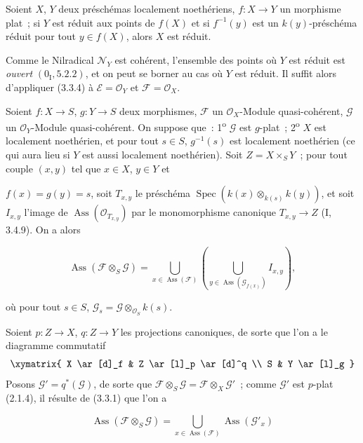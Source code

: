 \begin{corollary}[3.3.5]
\label{IV.2.3.3.5-fr}
Soient $X$, $Y$ deux préschémas localement noethériens, $f:X\to Y$ un
morphisme plat~; si $Y$ est réduit aux points de $f(X)$ et si $f^{-1}(y)$ est
un $k(y)$-préschéma réduit pour tout $y\in f(X)$, alors $X$ est réduit.
\end{corollary}

Comme le Nilradical $\mathcal N_Y$ est cohérent, l'ensemble des points où $Y$
est réduit est \emph{ouvert} $(0_{\mathrm I},5.2.2)$, et on peut se borner au
cas où $Y$ est réduit. Il suffit alors d'appliquer (3.3.4) à
$\mathcal E=\mathcal O_Y$ et $\mathcal F=\mathcal O_X$.

\begin{proposition}[3.3.6]
\label{IV.2.3.3.6-fr}
Soient $f:X\to S$, $g:Y\to S$ deux morphismes, $\mathcal F$ un
$\mathcal O_X$-Module quasi-cohérent, $\mathcal G$ un $\mathcal O_Y$-Module
quasi-cohérent. On suppose que~: 1\textsuperscript{o} $\mathcal G$ est
$g$-plat~; 2\textsuperscript{o} $X$ est localement noethérien, et pour tout
$s\in S$, $g^{-1}(s)$ est localement noethérien (ce qui aura lieu si $Y$ est
aussi localement noethérien). Soit $Z=X\times_S Y$~; pour tout couple $(x,y)$
tel que $x\in X$, $y\in Y$ et

$f(x)=g(y)=s$, soit $T_{x,y}$ le préschéma
$\operatorname{Spec}(k(x)\otimes_{k(s)}k(y))$, et soit $I_{x,y}$ l'image de
$\operatorname{Ass}(\mathcal O_{T_{x,y}})$ par le monomorphisme canonique
$T_{x,y}\to Z$ (I, 3.4.9). On a alors
\end{proposition}

\begin{env}[3.3.6.1]
\label{IV.2.3.3.6.1-fr}
\[
\operatorname{Ass}(\mathcal F\otimes_S\mathcal G)
=\bigcup_{x\in\operatorname{Ass}(\mathcal F)}
\left(\bigcup_{y\in\operatorname{Ass}(\mathcal G_{f(x)})}I_{x,y}\right),
\]
\end{env}

où pour tout $s\in S$, $\mathcal G_s=\mathcal G\otimes_{\mathcal O_S}k(s)$.

Soient $p:Z\to X$, $q:Z\to Y$ les projections canoniques, de sorte que l'on
a le diagramme commutatif
\[
\xymatrix{
X \ar[d]_f & Z \ar[l]_p \ar[d]^q \\
S & Y \ar[l]_g
}
\]
Posons $\mathcal G'=q^*(\mathcal G)$, de sorte que
$\mathcal F\otimes_S\mathcal G=\mathcal F\otimes_X\mathcal G'$~; comme
$\mathcal G'$ est $p$-plat (2.1.4), il résulte de (3.3.1) que l'on a

\begin{env}[3.3.6.2]
\label{IV.2.3.3.6.2-fr}
\[
\operatorname{Ass}(\mathcal F\otimes_S\mathcal G)
=\bigcup_{x\in\operatorname{Ass}(\mathcal F)}
\operatorname{Ass}(\mathcal G'_x)
\]
\end{env}

